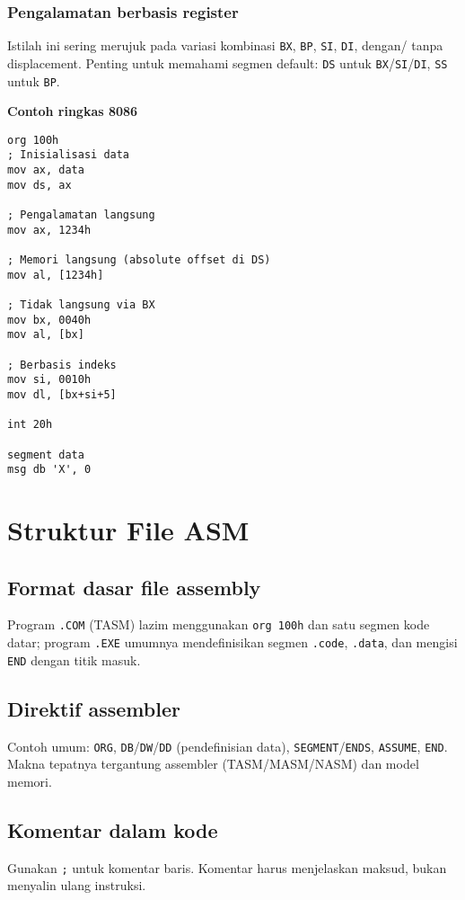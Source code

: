 \subsubsection{Pengalamatan berbasis register}
Istilah ini sering merujuk pada variasi kombinasi \texttt{BX}, \texttt{BP}, \texttt{SI}, \texttt{DI}, dengan/ tanpa displacement. Penting untuk memahami segmen default: \texttt{DS} untuk \texttt{BX}/\texttt{SI}/\texttt{DI}, \texttt{SS} untuk \texttt{BP}.

\noindent\textbf{Contoh ringkas 8086}
\begin{verbatim}
org 100h
; Inisialisasi data
mov ax, data
mov ds, ax

; Pengalamatan langsung
mov ax, 1234h

; Memori langsung (absolute offset di DS)
mov al, [1234h]

; Tidak langsung via BX
mov bx, 0040h
mov al, [bx]

; Berbasis indeks
mov si, 0010h
mov dl, [bx+si+5]

int 20h

segment data
msg db 'X', 0
\end{verbatim}

\section{Struktur File ASM}
\subsection{Format dasar file assembly}
Program \texttt{.COM} (TASM) lazim menggunakan \texttt{org 100h} dan satu segmen kode datar; program \texttt{.EXE} umumnya mendefinisikan segmen \texttt{.code}, \texttt{.data}, dan mengisi \texttt{END} dengan titik masuk.

\subsection{Direktif assembler}
Contoh umum: \texttt{ORG}, \texttt{DB}/\texttt{DW}/\texttt{DD} (pendefinisian data), \texttt{SEGMENT}/\texttt{ENDS}, \texttt{ASSUME}, \texttt{END}. Makna tepatnya tergantung assembler (TASM/MASM/NASM) dan model memori.

\subsection{Komentar dalam kode}
Gunakan \texttt{;} untuk komentar baris. Komentar harus menjelaskan maksud, bukan menyalin ulang instruksi.

